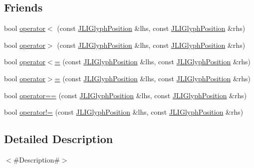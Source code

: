\subsection*{Friends}
\begin{DoxyCompactItemize}
\item 
bool \mbox{\hyperlink{structnjli_1_1_j_l_i_glyph_position_ab5ffd6bb77fffd445c0d9f38ea8621e5}{operator$<$}} (const \mbox{\hyperlink{structnjli_1_1_j_l_i_glyph_position}{J\+L\+I\+Glyph\+Position}} \&lhs, const \mbox{\hyperlink{structnjli_1_1_j_l_i_glyph_position}{J\+L\+I\+Glyph\+Position}} \&rhs)
\item 
bool \mbox{\hyperlink{structnjli_1_1_j_l_i_glyph_position_a9becd8eef286422eab003470608064be}{operator$>$}} (const \mbox{\hyperlink{structnjli_1_1_j_l_i_glyph_position}{J\+L\+I\+Glyph\+Position}} \&lhs, const \mbox{\hyperlink{structnjli_1_1_j_l_i_glyph_position}{J\+L\+I\+Glyph\+Position}} \&rhs)
\item 
bool \mbox{\hyperlink{structnjli_1_1_j_l_i_glyph_position_aa0679a354ebebacc7d31aabff0a4e05d}{operator$<$=}} (const \mbox{\hyperlink{structnjli_1_1_j_l_i_glyph_position}{J\+L\+I\+Glyph\+Position}} \&lhs, const \mbox{\hyperlink{structnjli_1_1_j_l_i_glyph_position}{J\+L\+I\+Glyph\+Position}} \&rhs)
\item 
bool \mbox{\hyperlink{structnjli_1_1_j_l_i_glyph_position_aa3fc3849f99bd39c429f75f9f2fd65ea}{operator$>$=}} (const \mbox{\hyperlink{structnjli_1_1_j_l_i_glyph_position}{J\+L\+I\+Glyph\+Position}} \&lhs, const \mbox{\hyperlink{structnjli_1_1_j_l_i_glyph_position}{J\+L\+I\+Glyph\+Position}} \&rhs)
\item 
bool \mbox{\hyperlink{structnjli_1_1_j_l_i_glyph_position_a8c627839571ed060bd66b86b6fdf75e0}{operator==}} (const \mbox{\hyperlink{structnjli_1_1_j_l_i_glyph_position}{J\+L\+I\+Glyph\+Position}} \&lhs, const \mbox{\hyperlink{structnjli_1_1_j_l_i_glyph_position}{J\+L\+I\+Glyph\+Position}} \&rhs)
\item 
bool \mbox{\hyperlink{structnjli_1_1_j_l_i_glyph_position_aa324a7eb79043aebc5e1c41c8cffbd00}{operator!=}} (const \mbox{\hyperlink{structnjli_1_1_j_l_i_glyph_position}{J\+L\+I\+Glyph\+Position}} \&lhs, const \mbox{\hyperlink{structnjli_1_1_j_l_i_glyph_position}{J\+L\+I\+Glyph\+Position}} \&rhs)
\end{DoxyCompactItemize}


\subsection{Detailed Description}
$<$\#\+Description\#$>$ 

